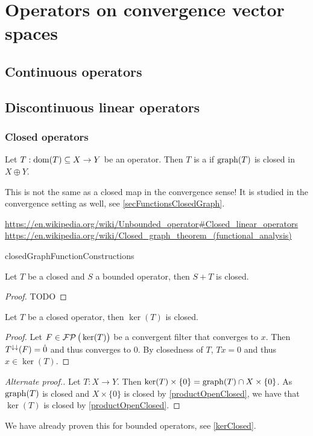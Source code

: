 \chapter{Operators on convergence vector spaces}

\section{Continuous operators}

\section{Discontinuous linear operators}
\subsection{Closed operators}
\begin{definition}
Let $T:\operatorname{dom}(T)\subseteq X\to Y$ be an operator. Then $T$ is a  if $\operatorname{graph}(T)$ is closed in $X\oplus Y$.
\end{definition}
This is not the same as a closed map in the convergence sense! It is studied in the convergence setting as well, see \ref{secFunctionsClosedGraph}.

\url{https://en.wikipedia.org/wiki/Unbounded_operator#Closed_linear_operators}
\url{https://en.wikipedia.org/wiki/Closed_graph_theorem_(functional_analysis)}

{closedGraphFunctionConstructions}

\begin{lemma} \label{algebraClosedOperators}
Let $T$ be a closed and $S$ a bounded operator, then $S+T$ is closed.
\end{lemma}
\begin{proof}
TODO
\end{proof}

\begin{lemma} \label{closedOperatorKernelClosed}
Let $T$ be a closed operator, then $\ker(T)$ is closed.
\end{lemma}
\begin{proof}
Let $F\in\operatorname{\mathcal{FP}}\big(\ker(T)\big)$ be a convergent filter that converges to $x$. Then $T^{\downarrow\downarrow}(F) = \dot{0}$ and thus converges to $0$. By closedness of $T$, $Tx = 0$ and thus $x\in\ker(T)$. 
\end{proof}
\begin{proof}[Alternate proof.]
Let $T: X\to Y$. Then $\ker(T)\times\{0\} = \operatorname{graph}(T)\cap X\times\{0\}$. As $\operatorname{graph}(T)$ is closed and $X\times\{0\}$ is closed by \ref{productOpenClosed}, we have that $\ker(T)$ is closed by \ref{productOpenClosed}.
\end{proof}
We have already proven this for bounded operators, see \ref{kerClosed}.

